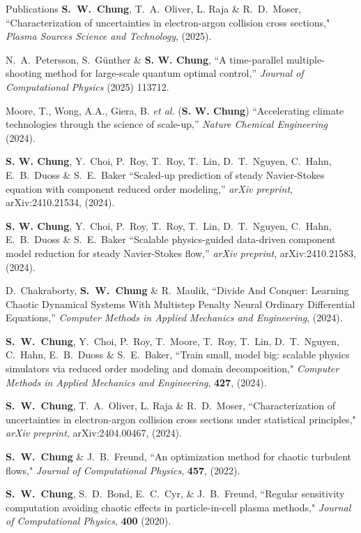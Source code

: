 \documentclass{resume} %
\begin{document}
\clearpage
\begin{rSection}{Publications}
\textbf{S.\ W.\ Chung}, T.\ A.\ Oliver, L. Raja \& R.\ D.\ Moser,
``Characterization of uncertainties in electron-argon collision cross sections,"
\textit{Plasma Sources Science and Technology}, (2025).
\par
N.\ A.\ Petersson, S.\ G{\"u}nther \& \textbf{S. W. Chung},
``A time-parallel multiple-shooting method for large-scale quantum optimal control,''
\textit{Journal of Computational Physics} (2025) 113712.
\par
Moore, T., Wong, A.A., Giera, B. \textit{et al.} (\textbf{S. W. Chung})
``Accelerating climate technologies through the science of scale-up,''
\textit{Nature Chemical Engineering} (2024).
\par
\textbf{S. W. Chung}, Y.\ Choi, P.\ Roy, T.\ Roy, T.\ Lin, D.\ T.\ Nguyen, C.\ Hahn, E.\ B.\ Duoss \& S.\ E.\ Baker
``Scaled-up prediction of steady Navier-Stokes equation with component reduced order modeling,''
\textit{arXiv preprint}, arXiv:2410.21534, (2024).
\par
\textbf{S. W. Chung}, Y.\ Choi, P.\ Roy, T.\ Roy, T.\ Lin, D.\ T.\ Nguyen, C.\ Hahn, E.\ B.\ Duoss \& S.\ E.\ Baker
``Scalable physics-guided data-driven component model reduction for steady Navier-Stokes flow,''
\textit{arXiv preprint}, arXiv:2410.21583, (2024).
\par
D.\ Chakraborty, \textbf{S.\ W.\ Chung} \& R.\ Maulik,
``Divide And Conquer: Learning Chaotic Dynamical Systems With Multistep Penalty Neural Ordinary Differential Equations,''
\textit{Computer Methods in Applied Mechanics and Engineering}, (2024).
\par
\textbf{S.\ W.\ Chung}, Y.\ Choi, P.\ Roy, T.\ Moore, T.\ Roy, T.\ Lin, D.\ T.\ Nguyen, C.\ Hahn, E.\ B.\ Duoss \& S.\ E.\ Baker,
``Train small, model big: scalable physics simulators via reduced order modeling and domain decomposition,"
\textit{Computer Methods in Applied Mechanics and Engineering}, \textbf{427}, (2024).
\par
\textbf{S.\ W.\ Chung}, T.\ A.\ Oliver, L. Raja \& R.\ D.\ Moser,
``Characterization of uncertainties in electron-argon collision cross sections under statistical principles,"
\textit{arXiv preprint}, arXiv:2404.00467, (2024).
\par
\par
\textbf{S.\ W.\ Chung} \& J.\ B.\ Freund,
``An optimization method for chaotic turbulent flows,"
\textit{Journal of Computational Physics}, \textbf{457}, (2022).
\par
\textbf{S.\ W.\ Chung}, S.\ D.\ Bond, E.\ C.\ Cyr, \& J.\ B.\ Freund,
``Regular sensitivity computation avoiding chaotic effects in particle-in-cell plasma methods,"
\textit{Journal of Computational Physics}, \textbf{400} (2020).
\end{rSection}
\end{document}
